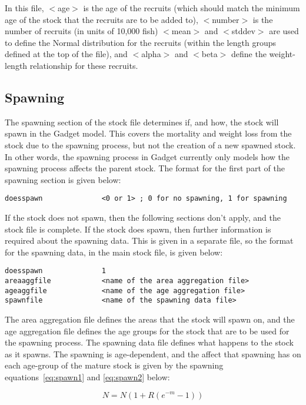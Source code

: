 \documentclass [a4paper, 10pt]{book}
\begin{document}
In this file, $<$age$>$ is the age of the recruits (which should match the minimum age of the stock that the recruits are to be added to), $<$number$>$ is the number of recruits (in units of 10,000 fish) $<$mean$>$ and $<$stddev$>$ are used to define the Normal distribution for the recruits (within the length groups defined at the top of the file), and $<$alpha$>$ and $<$beta$>$ define the weight-length relationship for these recruits.

\subsection{Spawning}\label{subsec:stockspawn}
The spawning section of the stock file determines if, and how, the stock will spawn in the Gadget model.   This covers the mortality and weight loss from the stock due to the spawning process, but not the creation of a new spawned stock.  In other words, the spawning process in Gadget currently only models how the spawning process affects the parent stock.  The format for the first part of the spawning section is given below:

{\small\begin{verbatim}
doesspawn              <0 or 1> ; 0 for no spawning, 1 for spawning
\end{verbatim}}

If the stock does not spawn, then the following sections don't apply, and the stock file is complete.  If the stock does spawn, then further information is required about the spawning data.  This is given in a separate file, so the format for the spawning data, in the main stock file, is given below:

{\small\begin{verbatim}
doesspawn              1
areaaggfile            <name of the area aggregation file>
ageaggfile             <name of the age aggregation file>
spawnfile              <name of the spawning data file>
\end{verbatim}}

The area aggregation file defines the areas that the stock will spawn on, and the age aggregation file defines the age groups for the stock that are to be used for the spawning process.  The spawning data file defines what happens to the stock as it spawns.  The spawning is age-dependent, and the affect that spawning has on each age-group of the mature stock is given by the spawning equations~\ref{eq:spawn1} and \ref{eq:spawn2} below:

\begin{equation}\label{eq:spawn1}
N = N {\left(1 + R {(e^{-m} - 1)}\right)}
\end{equation}
\end{document}
